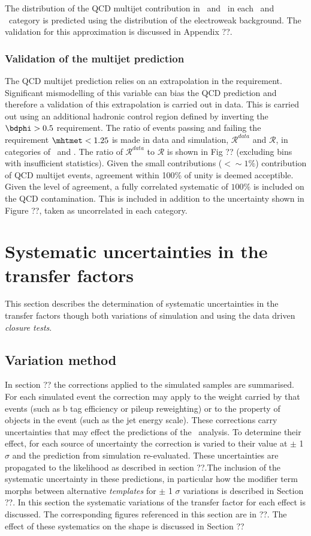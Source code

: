The distribution of the QCD multijet contribution in \nb~and \mht~in each \scalht~and \njet~category
is predicted using the distribution of the electroweak background. The validation 
for this approximation is discussed in Appendix ??.

\subsubsection{Validation of the multijet prediction}

The QCD multijet prediction relies on an extrapolation in the \mhtmet requirement.
Significant mismodelling of this variable can bias the QCD prediction and therefore a validation
of this extrapolation is carried out in data. This is carried out using an additional hadronic control 
region defined by inverting the $\bdphi > 0.5$ requirement. The ratio of events passing and failing 
the requirement $\mhtmet < 1.25$ is made in data and simulation, $\mathcal{R}^{data}$ and $\mathcal{R}$,
in categories of \njet~and \scalht. The ratio of $\mathcal{R}^{data}$ to $\mathcal{R}$ is shown in
Fig ?? (excluding bins with insufficient statistics). Given the small contributions ($<\sim 1\%$)
contribution of QCD multijet events, agreement within 100\% of unity is deemed acceptible. 
Given the level of agreement, a fully correlated systematic of $100\%$ is included on
the QCD contamination. This is included in addition to the uncertainty shown in 
Figure ??, taken as uncorrelated in each category.

\section{Systematic uncertainties in the transfer factors}
\label{sec:syst-uncs}
This section describes the determination of systematic uncertainties 
in the transfer factors though both variations of simulation
and using the data driven \emph{closure tests}. 

\subsection{Variation method}
In section ?? the corrections applied to the simulated samples are summarised. For each 
simulated event the correction may apply to the weight carried by that events (such as b tag efficiency
or pileup reweighting) or to the property of objects in the event (such as the jet energy scale). 
These corrections carry uncertainties that may effect the predictions of the \alphat~analysis.
To determine their effect, for each source of uncertainty the correction is varied to their
value at $\pm$ 1 $\sigma$ and the prediction from simulation re-evaluated. These uncertainties are
propagated to the likelihood as described in section ??.The inclusion of the systematic uncertainty 
in these predictions, in particular how the modifier term morphs between alternative \emph{templates} 
for $\pm$ 1 $\sigma$ variations is described in Section ??. In this section the systematic variations
of the transfer factor for each effect is discussed. The corresponding figures referenced in
this section are in ??. The effect of these systematics on the \mht shape is discussed in Section ??

